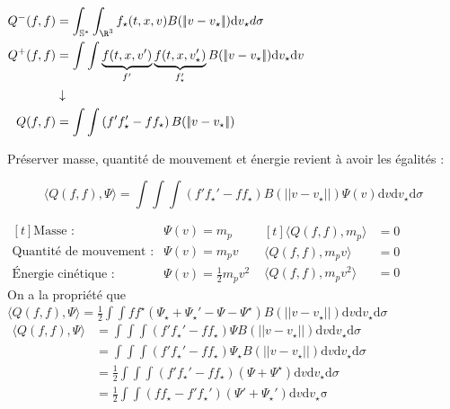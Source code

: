 \documentclass[12pt,a4paper]{article}
\begin{document}
$\begin{aligned}
	Q^-(f,f) &= \displaystyle\int_{\mathbb{S}^*}\int_{\R^3} f_\star(t,x,v)B(|\!|v-v_\star|\!|)\mathrm dv_\star d\sigma\\
	Q^+(f,f) &= \displaystyle\int\int \underbrace{f(t,x,v')}_{f'}\underbrace{f(t,x,v_\star')}_{f_\star'}B(|\!|v-v_\star|\!|)\mathrm dv_\star\mathrm dv\\
	&\downarrow\\
	Q(f,f) &= \int\int \left(f'f_\star' - ff_\star\right)B(|\!|v-v_\star|\!|)
\end{aligned}$

Préserver masse, quantité de mouvement et énergie revient à avoir les égalités :

\[
\langle Q(f,f),\Psi\rangle = \displaystyle\int\int\int \left(f'f_\star'-ff_\star\right)B(|\!|v-v_\star|\!|)\Psi(v)\mathrm dv \mathrm dv_\star \mathrm d\sigma
\]

$\begin{aligned}[t]
	\text{Masse :} & \Psi(v) = m_p\\
\text{Quantité de mouvement :} & \Psi(v) = m_pv\\
\text{Énergie cinétique :} & \Psi(v) = \frac12 m_p v^2
\end{aligned}$ \hspace{.5cm} $\begin{aligned}[t]
	\langle Q(f,f),m_p\rangle &= 0\\
	\langle Q(f,f), m_p v\rangle &=0 \\
	\langle Q(f,f),m_pv^2\rangle &=0
\end{aligned}$	\\

On a la propriété que $\langle Q(f,f), \Psi\rangle = \frac12 \displaystyle\int\int ff^\star\left(\Psi_\star+\Psi_\star'-\Psi-\Psi^\star\right)B(|\!|v-v_\star|\!|)\mathrm dv \mathrm dv_\star \mathrm d\sigma$\\

$\begin{aligned}
	\langle Q(f,f),\Psi\rangle &= \displaystyle\int\int\int \left(f'f_\star'-ff_\star\right)\Psi B(|\!|v-v_\star|\!|)\mathrm dv \mathrm dv_\star \mathrm d\sigma\\
	&= \int\int\int \left(f'f_\star' - ff_\star\right)\Psi_\star B(|\!|v-v_\star|\!|)\mathrm dv \mathrm dv_\star \mathrm d\sigma \\
	&= \frac12 \int\int\int \left(f'f_\star'-ff_\star\right)\left(\Psi+\Psi^\star\right)\mathrm dv\mathrm dv_\star \mathrm d\sigma \\
	&= \frac12 \int\int \left(ff_\star - f'f_\star'\right)\left(\Psi'+\Psi_\star'\right)\mathrm dv\mathrm dv_\star\mathrm\sigma
\end{aligned}$
\end{document}

